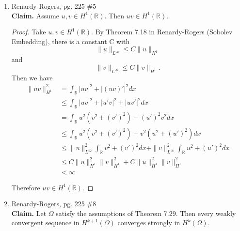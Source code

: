 \documentclass[a4paper]{article}
\newenvironment{claim}{\textbf{Claim.}}{}
\newcommand{\R}{\mathbb{R}}
\begin{document}
\begin{enumerate}
\begin{proof}
\begin{enumerate}
            \textbf{MUST SHOW UNIT NORMAL TO BALL IS SAME AS UNIT NORMAL TO $U$}

            Therefore,
            \[ \frac{\partial u}{\partial \nu} > 0 \]
            where $\nu$ is the outer unit normal to $U$. This is a contradiction, so $u$ must be constant.
        \end{enumerate}
      \end{proof}

  \item Renardy-Rogers, pg. 225 \#5 \\
    \begin{claim}
      Assume $u,v \in H^1(\R)$. Then $uv \in H^1(\R)$.
    \end{claim}

    \begin{proof}
      Take $u,v \in H^1(\R)$. By Theorem 7.18 in Renardy-Rogers (Sobolev Embedding), there is a constant C with
      \[ \|u\|_{L^\infty} \leq C \|u\|_{H^1} \]
      and
      \[ \|v\|_{L^\infty} \leq C \|v\|_{H^1} .\]
      Then we have
      \begin{align*}
        \|uv\|_{H^1}^2 &= \int_{\R}^{} |uv|^2 + |(uv)'|^2 dx \\
        &\leq \int_{\R}^{} |uv|^2 + |u' v|^2 + |u v'|^2 dx \\
        &= \int_{\R}^{} u^2 (v^2 + (v')^2) + (u')^2 v^2 dx \\
        &\leq \int_{\R}^{} u^2 (v^2 + (v')^2) + v^2 (u^2 + (u')^2) dx \\
        &\leq \|u\|_{L^\infty}^2 \int_{\R}^{} v^2 + (v')^2 dx + \|v\|_{L^\infty}^2 \int_{\R}^{} u^2 + (u')^2 dx \\
        &\leq C \|u\|_{H^1}^2 \|v\|_{H^1}^2 + C \|u\|_{H^1}^2 \|v\|_{H^1}^2 \\
        &< \infty
      \end{align*}

      Therefore $uv \in H^1(\R)$.
    \end{proof}

  \item Renardy-Rogers, pg. 225 \#8 \\
    \begin{claim}
      Let $\Omega$ satisfy the assumptions of Theorem 7.29. Then every weakly convergent sequence in $H^{k+1}(\Omega)$ converges strongly in
      $H^k(\Omega)$.
    \end{claim}


\end{enumerate}
\end{document}
